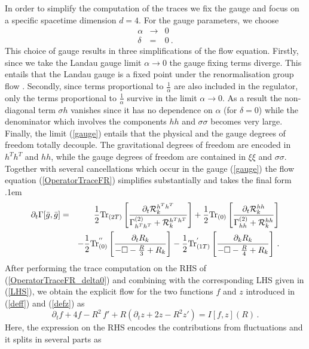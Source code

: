 \documentclass[notitlepage,eqsecnum,bm,amsmath,preprintnumbers,superscriptaddress,nofootinbib,aps,11pt]{revtex4-1}
\def\eq#1{(\ref{#1})}
\def\R{\rho}
\def\R{R}
\def\bea{\arraycolsep .1em \begin{eqnarray}}
\def\eea{\end{eqnarray}}
\begin{document}
In order to simplify the computation of the traces we fix the gauge and focus on a specific spacetime dimension $d=4$. For the gauge parameters, we choose
\begin{eqnarray}\label{gauge}
\alpha&\to&0\\
\nonumber
\delta&=&0\ .
\end{eqnarray}
This choice of gauge results in three simplifications of the flow equation. Firstly, since we take the Landau gauge  limit $\alpha\to0$ the gauge fixing terms diverge. 
This entails that the Landau gauge is a fixed point under the renormalisation group flow \cite{Litim:1998qi}. Secondly,
since terms proportional to $\frac{1}{\alpha}$ are also included in the regulator, only the terms proportional to $\frac{1}{\alpha}$ survive in the limit $\alpha\to
0$. As a result the non-diagonal term $\sigma h$ vanishes since it has no dependence on $\alpha$ (for $\delta=0$) while the denominator which involves the components $hh$ and $\sigma \sigma$ becomes very large. Finally, the limit \eq{gauge} entails  that the physical and the gauge degrees of freedom totally decouple. The gravitational degrees of freedom are encoded in $h^Th^T$ and $hh$, while the gauge degrees of freedom are contained in $\xi\xi$ and $\sigma\sigma$.
Together with several cancellations which occur in the gauge \eq{gauge} the flow equation \eq{OperatorTraceFR} simplifies substantially and takes the final form
\bea
\partial_t\Gamma[\bar g,\bar g]&=&\frac{1}{2}\textnormal{Tr}_{(2T)}\left[\frac{\partial_t\mathcal{R}_k^{h^Th^T}}{\Gamma^{(2)}_{h^Th^T} + \mathcal{R}_k^{h^Th^T} }\right]  +\frac{1}{2}\textnormal{Tr}_{(0)}\left[\frac{\partial_t\mathcal{R}_k^{hh}}{\Gamma^{(2)}_{hh} + \mathcal{R}_k^{hh} }\right]
\nonumber \\ && - \frac{1}{2} \textnormal{Tr}_{(0)}^{''}\left[\frac{\partial_t R_k }{  - \Box - \frac{R}{3}   +   R_k }\right]  - \frac{1}{2} \textnormal{Tr}_{(1T)}^{'}\left[\frac{\partial_k R_k }{ -\Box - \frac{R}{4}   + R_k   }\right] \,.
\label{OperatorTraceFR_delta0}
\eea
After performing the trace computation on the RHS of \eq{OperatorTraceFR_delta0}  and combining with the corresponding LHS given in \eq{LHS}, we obtain the explicit flow for the two functions $f$ and $z$ introduced in \eq{deff} and \eq{defz} as 
\begin{equation}
\partial_t f+ 4 f-\R^2\,f'+\R\left(\partial_t z+2  z-\R^2  z' \right)=I[f,z](\R) \,.\label{FlowEquationRM}
\end{equation}
Here, the expression on the RHS encodes the contributions from fluctuations and it splits in several parts as
\end{document}
